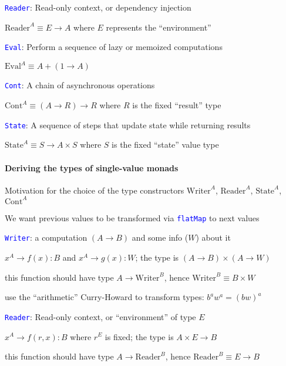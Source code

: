 \texttt{\textcolor{blue}{\footnotesize{}Reader}}: Read-only context,
or dependency injection

$\text{Reader}^{A}\equiv E\rightarrow A$ where $E$ represents the
``environment''

\texttt{\textcolor{blue}{\footnotesize{}Eval}}: Perform a sequence
of lazy or memoized computations

$\text{Eval}^{A}\equiv A+\left(1\rightarrow A\right)$

\texttt{\textcolor{blue}{\footnotesize{}Cont}}: A chain of asynchronous
operations

$\text{Cont}^{A}\equiv\left(A\rightarrow R\right)\rightarrow R$ where
$R$ is the fixed ``result'' type

\texttt{\textcolor{blue}{\footnotesize{}State}}: A sequence of steps
that update state while returning results

$\text{State}^{A}\equiv S\rightarrow A\times S$ where $S$ is the
fixed ``state'' value type


\paragraph{Deriving the types of single-value monads}

Motivation for the choice of the type constructors $\text{Writer}^{A}$,
$\text{Reader}^{A}$, $\text{State}^{A}$, $\text{Cont}^{A}$

We want previous values to be transformed via \texttt{\textcolor{blue}{\footnotesize{}flatMap}}
to next values

\texttt{\textcolor{blue}{\footnotesize{}Writer}}: a computation $\left(A\rightarrow B\right)$
and some info ($W$) about it

$x^{A}\rightarrow f(x):B$ and $x^{A}\rightarrow g(x):W$; the type
is $\left(A\rightarrow B\right)\times\left(A\rightarrow W\right)$

this function should have type $A\rightarrow\text{Writer}^{B}$, hence
$\text{Writer}^{B}\equiv B\times W$ 

use the ``arithmetic'' Curry-Howard to transform types: $b^{a}w^{a}=(bw)^{a}$

\texttt{\textcolor{blue}{\footnotesize{}Reader}}: Read-only context,
or ``environment'' of type $E$

$x^{A}\rightarrow f(r,x):B$ where $r^{E}$ is fixed; the type is
$A\times E\rightarrow B$

this function should have type $A\rightarrow\text{Reader}^{B}$, hence
$\text{Reader}^{B}\equiv E\rightarrow B$

